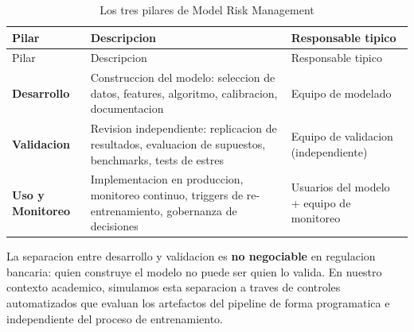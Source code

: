 \documentclass[
  spanish,
  11pt,
  letterpaper,
]{scrbook}
\theoremstyle{plain}
\theoremstyle{remark}
\begin{document}
\begin{longtable}[]{@{}
  >{\raggedright\arraybackslash}p{}
  >{\raggedright\arraybackslash}p{}
  >{\raggedright\arraybackslash}p{}@{}}
\caption{Los tres pilares de Model Risk
Management}\label{tbl-mrm-pillars}\tabularnewline
\toprule\noalign{}
\begin{minipage}[b]{\linewidth}\raggedright
Pilar
\end{minipage} & \begin{minipage}[b]{\linewidth}\raggedright
Descripcion
\end{minipage} & \begin{minipage}[b]{\linewidth}\raggedright
Responsable tipico
\end{minipage} \\
\midrule\noalign{}
\endfirsthead
\toprule\noalign{}
\begin{minipage}[b]{\linewidth}\raggedright
Pilar
\end{minipage} & \begin{minipage}[b]{\linewidth}\raggedright
Descripcion
\end{minipage} & \begin{minipage}[b]{\linewidth}\raggedright
Responsable tipico
\end{minipage} \\
\midrule\noalign{}
\endhead
\bottomrule\noalign{}
\endlastfoot
\textbf{Desarrollo} & Construccion del modelo: seleccion de datos,
features, algoritmo, calibracion, documentacion & Equipo de modelado \\
\textbf{Validacion} & Revision independiente: replicacion de resultados,
evaluacion de supuestos, benchmarks, tests de estres & Equipo de
validacion (independiente) \\
\textbf{Uso y Monitoreo} & Implementacion en produccion, monitoreo
continuo, triggers de re-entrenamiento, gobernanza de decisiones &
Usuarios del modelo + equipo de monitoreo \\
\end{longtable}

La separacion entre desarrollo y validacion es \textbf{no negociable} en
regulacion bancaria: quien construye el modelo no puede ser quien lo
valida. En nuestro contexto academico, simulamos esta separacion a
traves de controles automatizados que evaluan los artefactos del
pipeline de forma programatica e independiente del proceso de
entrenamiento.
\end{document}
